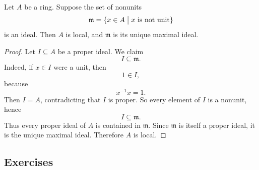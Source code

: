 \begin{prop}
    Let $A$ be a ring. Suppose the set of nonunits 
    \[
        \mathfrak m = \{x \in A \bigm| x \ \text{is not 
        unit}\}
    \]
    is an ideal. 
    Then $A$ is local, and $\mathfrak m$ is its unique 
    maximal ideal. 
\end{prop}
\begin{proof}
    Let $I \subseteq A$ be a proper ideal. 
    We claim 
    \[
        I \subseteq \mathfrak m. 
    \]
    Indeed, if $x \in I$ were a unit, then 
    \[
        1 \in I,
    \]
    because 
    \[
        x^{-1}x = 1. 
    \]
    Then $I = A$, contradicting that $I$ is proper. 
    So every element of $I$ is a nonunit, hence 
    \[
        I \subseteq \mathfrak m. 
    \]
    Thus every proper ideal of $A$ is contained in 
    $\mathfrak m$. 
    Since $\mathfrak m$ is itself a proper ideal, 
    it is the unique maximal ideal. Therefore $A$ is local. 
\end{proof}

\subsection*{Exercises}

